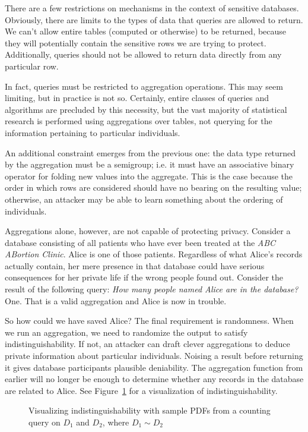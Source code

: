 \documentclass[12pt]{report}
\begin{document}
There are a few restrictions on mechanisms in the context of sensitive databases.
Obviously, there are limits to the types of data that queries are allowed to return.
We can't allow entire tables (computed or otherwise) to be returned, because they will potentially contain the sensitive rows we are trying to protect.
Additionally, queries should not be allowed to return data directly from any particular row.

In fact, queries must be restricted to aggregation operations.
This may seem limiting, but in practice is not so.
Certainly, entire classes of queries and algorithms are precluded by this necessity, but the vast majority of statistical research is performed using aggregations over tables, not querying for the information pertaining to particular individuals.

An additional constraint emerges from the previous one: the data type returned by the aggregation must be a semigroup; i.e. it must have an associative binary operator for folding new values into the aggregate.
This is the case because the order in which rows are considered should have no bearing on the resulting value; otherwise, an attacker may be able to learn something about the ordering of individuals.

Aggregations alone, however, are not capable of protecting privacy.
Consider a database consisting of all patients who have ever been treated at the \textit{ABC ABortion Clinic}.
Alice is one of those patients.
Regardless of what Alice's records actually contain, her mere presence in that database could have serious consequences for her private life if the wrong people found out.
Consider the result of the following query: \textit{How many people named Alice are in the database?}
One.
That is a valid aggregation and Alice is now in trouble.

So how could we have saved Alice?
The final requirement is randomness.
When we run an aggregation, we need to randomize the output to satisfy indistinguishability.
If not, an attacker can draft clever aggregations to deduce private information about particular individuals.
Noising a result before returning it gives database participants plausible deniability.
The aggregation function from earlier will no longer be enough to determine whether any records in the database are related to Alice.
See Figure~\ref{fig:indistinguishability} for a visualization of indistinguishability.

\begin{figure}
    \centering
    \def\svgwidth{\columnwidth}
    
    \caption{Visualizing indistinguishability with sample PDFs from a counting query on $D_1$ and $D_2$, where $D_1\sim D_2$}
    \label{fig:indistinguishability}
\end{figure}
\end{document}
